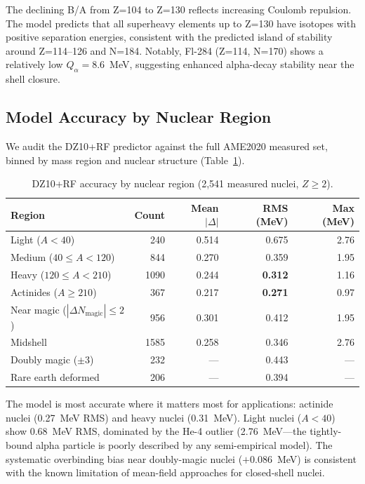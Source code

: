 \documentclass[letterpaper,11pt]{article}
\begin{document}
The declining B/A from Z=104 to Z=130 reflects increasing Coulomb repulsion.
The model predicts that all superheavy elements up to Z=130 have isotopes with
positive separation energies, consistent with the predicted island of stability
around Z=114--126 and N=184. Notably, Fl-284 (Z=114, N=170) shows a relatively
low $Q_\alpha = 8.6$~MeV, suggesting enhanced alpha-decay stability near the
shell closure.

\subsection{Model Accuracy by Nuclear Region}

We audit the DZ10+RF predictor against the full AME2020 measured set, binned by
mass region and nuclear structure (Table~\ref{tab:accuracy_region}).

\begin{table}[h]
\centering
\caption{DZ10+RF accuracy by nuclear region (2,541 measured nuclei, $Z \geq 2$).}
\label{tab:accuracy_region}
\begin{tabular}{lrrrr}
\toprule
Region & Count & Mean $|\Delta|$ & RMS (MeV) & Max (MeV) \\
\midrule
Light ($A < 40$) & 240 & 0.514 & 0.675 & 2.76 \\
Medium ($40 \leq A < 120$) & 844 & 0.270 & 0.359 & 1.95 \\
Heavy ($120 \leq A < 210$) & 1090 & 0.244 & \textbf{0.312} & 1.16 \\
Actinides ($A \geq 210$) & 367 & 0.217 & \textbf{0.271} & 0.97 \\
\midrule
Near magic ($|\Delta N_\text{magic}| \leq 2$) & 956 & 0.301 & 0.412 & 1.95 \\
Midshell & 1585 & 0.258 & 0.346 & 2.76 \\
Doubly magic ($\pm 3$) & 232 & --- & 0.443 & --- \\
Rare earth deformed & 206 & --- & 0.394 & --- \\
\bottomrule
\end{tabular}
\end{table}

The model is most accurate where it matters most for applications: actinide
nuclei (0.27~MeV RMS) and heavy nuclei (0.31~MeV). Light nuclei ($A < 40$)
show 0.68~MeV RMS, dominated by the He-4 outlier (2.76~MeV---the tightly-bound
alpha particle is poorly described by any semi-empirical model). The systematic
overbinding bias near doubly-magic nuclei ($+0.086$~MeV) is consistent with the
known limitation of mean-field approaches for closed-shell nuclei.
\end{document}

